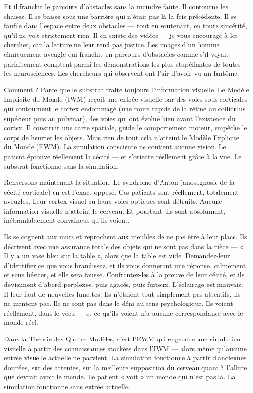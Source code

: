 \documentclass[11pt, twoside, openright]{book}
\begin{document}
Et il franchit le parcours d'obstacles sans la moindre faute. Il contourne les chaises. Il se baisse sous une barrière qui n'était pas là la fois précédente. Il se faufile dans l'espace entre deux obstacles --- tout en soutenant, en toute sincérité, qu'il ne voit strictement rien. Il en existe des vidéos --- je vous encourage à les chercher, car la lecture ne leur rend pas justice. Les images d'un homme cliniquement aveugle qui franchit un parcours d'obstacles comme s'il voyait parfaitement comptent parmi les démonstrations les plus stupéfiantes de toutes les neurosciences. Les chercheurs qui observent ont l'air d'avoir vu un fantôme.

Comment ? Parce que le substrat traite toujours l'information visuelle. Le Modèle Implicite du Monde (IWM) reçoit une entrée visuelle par des voies sous-corticales qui contournent le cortex endommagé (une route rapide de la rétine au colliculus supérieur puis au pulvinar), des voies qui ont évolué bien avant l'existence du cortex. Il construit une carte spatiale, guide le comportement moteur, empêche le corps de heurter les objets. Mais rien de tout cela n'atteint le Modèle Explicite du Monde (EWM). La simulation consciente ne contient aucune vision. Le patient éprouve réellement la cécité --- et s'oriente réellement grâce à la vue. Le substrat fonctionne sans la simulation.

Renversons maintenant la situation. Le syndrome d'Anton (anosognosie de la cécité corticale) en est l'exact opposé. Ces patients sont réellement, totalement aveugles. Leur cortex visuel ou leurs voies optiques sont détruits. Aucune information visuelle n'atteint le cerveau. Et pourtant, ils sont absolument, inébranlablement convaincus qu'ils voient.

Ils se cognent aux murs et reprochent aux meubles de ne pas être à leur place. Ils décrivent avec une assurance totale des objets qui ne sont pas dans la pièce --- « Il y a un vase bleu sur la table », alors que la table est vide. Demandez-leur d'identifier ce que vous brandissez, et ils vous donneront une réponse, calmement et sans hésiter, et elle sera fausse. Confrontez-les à la preuve de leur cécité, et ils deviennent d'abord perplexes, puis agacés, puis furieux. L'éclairage est mauvais. Il leur faut de nouvelles lunettes. Ils n'étaient tout simplement pas attentifs. Ils ne mentent pas. Ils ne sont pas dans le déni au sens psychologique. Ils voient réellement, dans le vécu --- et ce qu'ils voient n'a aucune correspondance avec le monde réel.

Dans la Théorie des Quatre Modèles, c'est l'EWM qui engendre une simulation visuelle à partir des connaissances stockées dans l'IWM --- alors même qu'aucune entrée visuelle actuelle ne parvient. La simulation fonctionne à partir d'anciennes données, sur des attentes, sur la meilleure supposition du cerveau quant à l'allure que devrait avoir le monde. Le patient « voit » un monde qui n'est pas là. La simulation fonctionne sans entrée actuelle.
\end{document}
